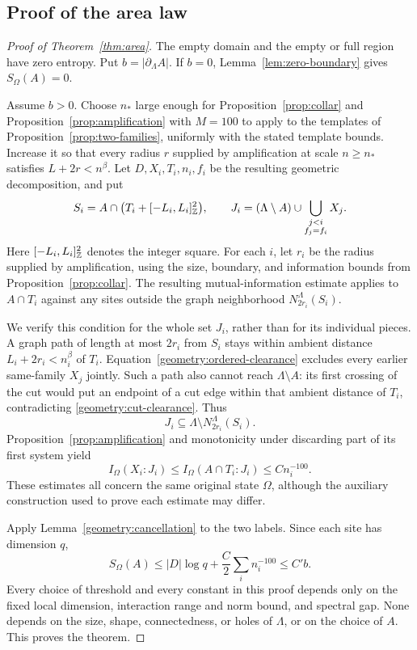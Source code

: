 \subsection{Proof of the area law}

\begin{proof}[Proof of Theorem~\ref{thm:area}]
The empty domain and the empty or full region have zero entropy.
Put $b=|\partial_\Lambda A|$. If $b=0$,
Lemma~\ref{lem:zero-boundary} gives $S_\Omega(A)=0$.

Assume $b>0$.  Choose $n_*$ large enough for
Proposition~\ref{prop:collar} and Proposition~\ref{prop:amplification}
with $M=100$ to apply to the templates of
Proposition~\ref{prop:two-families}, uniformly with the stated template
bounds.  Increase it so that every radius $r$ supplied by amplification
at scale $n\ge n_*$ satisfies $L+2r<n^\beta$.  Let $D,X_i,T_i,n_i,f_i$ be the
resulting geometric decomposition, and put
\[
 S_i=A\cap\bigl(T_i+[-L_i,L_i]^2_{\mathbb Z}\bigr),\qquad
 J_i=(\Lambda\setminus A)\cup
       \bigcup_{\substack{j<i\\f_j=f_i}}X_j.
\]
Here $[-L_i,L_i]^2_{\mathbb Z}$ denotes the integer square.  For each $i$, let
$r_i$ be the radius supplied by amplification, using the size, boundary,
and information bounds from Proposition~\ref{prop:collar}.  The resulting
mutual-information estimate applies to $A\cap T_i$ against any sites
outside the graph neighborhood $N_{2r_i}^{\Lambda}(S_i)$.

We verify this condition for the whole set $J_i$, rather than for its
individual pieces.  A graph path of length at most $2r_i$ from $S_i$
stays within ambient distance $L_i+2r_i<n_i^\beta$ of $T_i$.
Equation~\eqref{geometry:ordered-clearance} excludes every earlier
same-family $X_j$ jointly.  Such a path also cannot reach
$\Lambda\setminus A$: its first crossing of the cut would put an endpoint
of a cut edge within that ambient distance of $T_i$, contradicting
\eqref{geometry:cut-clearance}.  Thus
\[
 J_i\subseteq\Lambda\setminus N_{2r_i}^{\Lambda}(S_i).
\]
Proposition~\ref{prop:amplification} and monotonicity under discarding
part of its first system yield
\[
 I_\Omega(X_i:J_i)
 \le I_\Omega(A\cap T_i:J_i)\le C n_i^{-100}.
\]
These estimates all concern the same original state $\Omega$, although
the auxiliary construction used to prove each estimate may differ.

Apply Lemma~\ref{geometry:cancellation} to the two labels.  Since each
site has dimension $q$,
\[
 S_\Omega(A)
 \le |D|\log q+\frac C2\sum_i n_i^{-100}
 \le C' b.
\]
Every choice of threshold and every constant in this proof depends only
on the fixed local dimension, interaction range and norm bound, and
spectral gap.  None depends on the size, shape, connectedness, or holes
of $\Lambda$, or on the choice of $A$.  This proves the theorem.
\end{proof}
